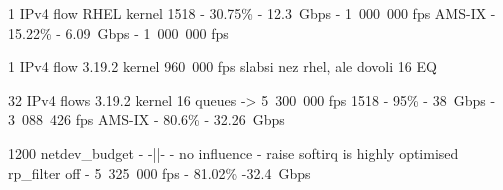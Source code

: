 1 IPv4 flow RHEL kernel
1518 - 30.75\% - 12.3~Gbps - 1~000~000 fps
AMS-IX - 15.22\% - 6.09~Gbps - 1~000~000 fps



1 IPv4 flow 3.19.2 kernel
960~000 fps
slabsi nez rhel, ale dovoli 16 EQ


32 IPv4 flows 3.19.2 kernel
16 queues -> 5~300~000 fps
1518 - 95\% - 38~Gbps - 3~088~426 fps
AMS-IX - 80.6\% - 32.26~Gbps

1200 netdev\_budget - -||- - no influence - raise softirq is highly optimised
rp\_filter off - 5~325~000 fps - 81.02\% -32.4~Gbps


